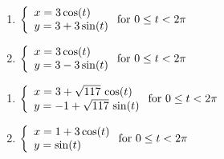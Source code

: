 \begin{multicols}{2}

\begin{enumerate}

\setcounter{enumi}{\value{HW}}

\item   ${\displaystyle \left\{ \begin{array}{l} x = 3\cos(t) \\ y = 3 + 3\sin(t)  \end{array} \right. \vspace{.25in} \mbox{for } 0 \leq t < 2\pi}$

\item   ${\displaystyle \left\{ \begin{array}{l} x = 3\cos(t) \\ y = 3 - 3\sin(t)  \end{array} \right. \vspace{.25in} \mbox{for } 0 \leq t < 2\pi }$

\setcounter{HW}{\value{enumi}}

\end{enumerate}

\end{multicols}



\begin{multicols}{2}

\begin{enumerate}

\setcounter{enumi}{\value{HW}}
\item   ${\displaystyle \left\{ \begin{array}{l} x = 3+\sqrt{117} \, \cos(t) \\ y = -1 + \sqrt{117} \, \sin(t)  \end{array} \right. \vspace{.25in} \mbox{for } 0 \leq t < 2\pi}$
\item   ${\displaystyle \left\{ \begin{array}{l} x = 1+3\cos(t) \\ y = \sin(t)  \end{array} \right. \vspace{.25in} \mbox{for } 0 \leq t < 2\pi}$

\setcounter{HW}{\value{enumi}}

\end{enumerate}

\end{multicols}

